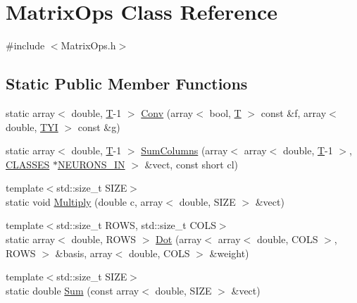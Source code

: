 \hypertarget{class_matrix_ops}{}\section{Matrix\+Ops Class Reference}
\label{class_matrix_ops}


{\ttfamily \#include $<$Matrix\+Ops.\+h$>$}

\subsection*{Static Public Member Functions}
\begin{DoxyCompactItemize}
\item 
static array$<$ double, \mbox{\hyperlink{_constants_8h_a6108cec236ef7a2e1d3259931de87186}{T}}-\/1 $>$ \mbox{\hyperlink{class_matrix_ops_a60b08cd335420a90840d198bb2eefed4}{Conv}} (array$<$ bool, \mbox{\hyperlink{_constants_8h_a6108cec236ef7a2e1d3259931de87186}{T}} $>$ const \&f, array$<$ double, \mbox{\hyperlink{_constants_8h_a45bcfb91788c7d66f5de11604fb1eb6e}{T\+YI}} $>$ const \&g)
\item 
static array$<$ double, \mbox{\hyperlink{_constants_8h_a6108cec236ef7a2e1d3259931de87186}{T}}-\/1 $>$ \mbox{\hyperlink{class_matrix_ops_af01b4d893a33c238ec0e82453ccf4b3e}{Sum\+Columns}} (array$<$ array$<$ double, \mbox{\hyperlink{_constants_8h_a6108cec236ef7a2e1d3259931de87186}{T}}-\/1 $>$, \mbox{\hyperlink{_constants_8h_a12148c0e36153a905f4f6ef1afdbb27e}{C\+L\+A\+S\+S\+ES}} $\ast$\mbox{\hyperlink{_constants_8h_aefc2426e4681da445c7793c98a83c532}{N\+E\+U\+R\+O\+N\+S\+\_\+\+IN}} $>$ \&vect, const short cl)
\item 
{\footnotesize template$<$std\+::size\+\_\+t S\+I\+ZE$>$ }\\static void \mbox{\hyperlink{class_matrix_ops_aa1f606534d91d3a651ee05b96a5702e1}{Multiply}} (double c, array$<$ double, S\+I\+ZE $>$ \&vect)
\item 
{\footnotesize template$<$std\+::size\+\_\+t R\+O\+WS, std\+::size\+\_\+t C\+O\+LS$>$ }\\static array$<$ double, R\+O\+WS $>$ \mbox{\hyperlink{class_matrix_ops_a91f52eb21bae8a73de6367c0c195f0a7}{Dot}} (array$<$ array$<$ double, C\+O\+LS $>$, R\+O\+WS $>$ \&basis, array$<$ double, C\+O\+LS $>$ \&weight)
\item 
{\footnotesize template$<$std\+::size\+\_\+t S\+I\+ZE$>$ }\\static double \mbox{\hyperlink{class_matrix_ops_a9444bf558d7a09f10965d565e12ba497}{Sum}} (const array$<$ double, S\+I\+ZE $>$ \&vect)

\end{DoxyCompactItemize}
